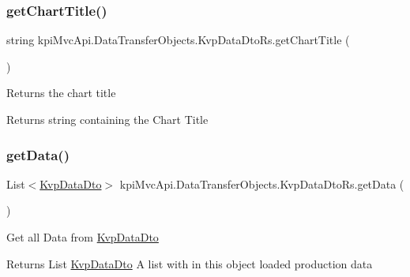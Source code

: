 \subsubsection{\texorpdfstring{get\+Chart\+Title()}{getChartTitle()}\hspace{0.1cm}{\footnotesize\ttfamily [2/2]}}
{\footnotesize\ttfamily string kpi\+Mvc\+Api.\+Data\+Transfer\+Objects.\+Kvp\+Data\+Dto\+Rs.\+get\+Chart\+Title (\begin{DoxyParamCaption}{ }\end{DoxyParamCaption})\hspace{0.3cm}{\ttfamily [inline]}}



Returns the chart title 

\begin{DoxyReturn}{Returns}
string containing the Chart Title
\end{DoxyReturn}
\mbox{\label{classkpi_mvc_api_1_1_data_transfer_objects_1_1_kvp_data_dto_rs_a895f4b97fb8c74c1a853145c03f5d393}} 
\subsubsection{\texorpdfstring{get\+Data()}{getData()}\hspace{0.1cm}{\footnotesize\ttfamily [1/2]}}
{\footnotesize\ttfamily List$<$\hyperlink{classkpi_mvc_api_1_1_data_transfer_objects_1_1_kvp_data_dto}{Kvp\+Data\+Dto}$>$ kpi\+Mvc\+Api.\+Data\+Transfer\+Objects.\+Kvp\+Data\+Dto\+Rs.\+get\+Data (\begin{DoxyParamCaption}{ }\end{DoxyParamCaption})\hspace{0.3cm}{\ttfamily [inline]}}



Get all Data from {\ttfamily \hyperlink{classkpi_mvc_api_1_1_data_transfer_objects_1_1_kvp_data_dto}{Kvp\+Data\+Dto}} 

\begin{DoxyReturn}{Returns}
{\ttfamily  List \hyperlink{classkpi_mvc_api_1_1_data_transfer_objects_1_1_kvp_data_dto}{Kvp\+Data\+Dto} } A list with in this object loaded production data 
\end{DoxyReturn}
\mbox{\label{classkpi_mvc_api_1_1_data_transfer_objects_1_1_kvp_data_dto_rs_a895f4b97fb8c74c1a853145c03f5d393}} 
